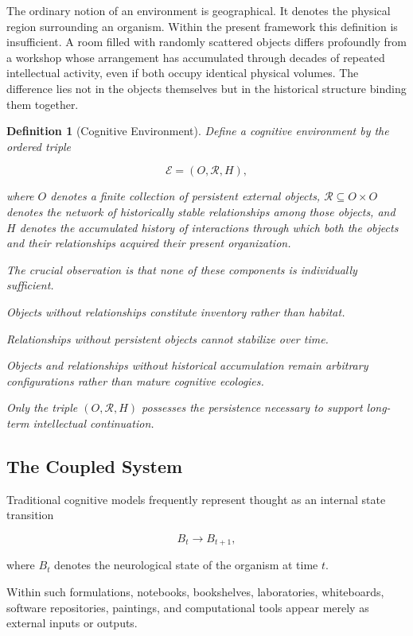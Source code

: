 \documentclass[12pt,oneside]{article}
\newtheorem{definition}{Definition}[section]
\theoremstyle{remark}
\begin{document}
The ordinary notion of an environment is geographical. It denotes the physical region surrounding an organism. Within the present framework this definition is insufficient. A room filled with randomly scattered objects differs profoundly from a workshop whose arrangement has accumulated through decades of repeated intellectual activity, even if both occupy identical physical volumes. The difference lies not in the objects themselves but in the historical structure binding them together.

\begin{definition}[Cognitive Environment]
Define a cognitive environment by the ordered triple

\[
\mathcal{E} = (O, \mathcal{R}, H),
\]

where \(O\) denotes a finite collection of persistent external objects, \(\mathcal{R} \subseteq O \times O\) denotes the network of historically stable relationships among those objects, and \(H\) denotes the accumulated history of interactions through which both the objects and their relationships acquired their present organization.

The crucial observation is that none of these components is individually sufficient.

Objects without relationships constitute inventory rather than habitat.

Relationships without persistent objects cannot stabilize over time.

Objects and relationships without historical accumulation remain arbitrary configurations rather than mature cognitive ecologies.

Only the triple \((O, \mathcal{R}, H)\) possesses the persistence necessary to support long-term intellectual continuation.
\end{definition}

\subsection{The Coupled System}

Traditional cognitive models frequently represent thought as an internal state transition

\[
B_t \longrightarrow B_{t+1},
\]

where \(B_t\) denotes the neurological state of the organism at time \(t\).

Within such formulations, notebooks, bookshelves, laboratories, whiteboards, software repositories, paintings, and computational tools appear merely as external inputs or outputs.
\end{document}
